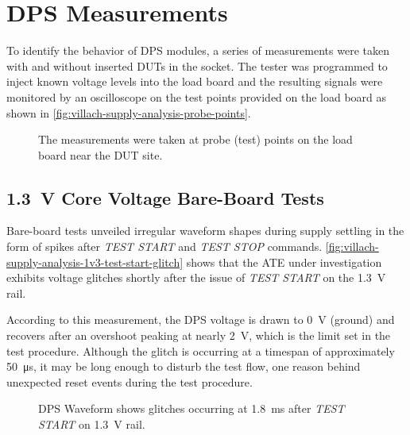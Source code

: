 

\section{\acs{DPS} Measurements}
\label{sec:dps-measurements}

To identify the behavior of \ac{DPS} modules, a series of measurements were
taken with and without inserted \acp{DUT} in the socket.
The tester was programmed to inject known voltage levels into the load board and
the resulting signals were monitored by an oscilloscope on the test points
provided on the load board as shown in
\autoref{fig:villach-supply-analysis-probe-points}.

\begin{figure}
    \centering
    \caption[Probe Points on the Load board]{
        The measurements were taken at probe (test) points on the
        load board near the \acs{DUT} site.
    }
    \label{fig:villach-supply-analysis-probe-points}
\end{figure}

\subsection{\SI{1.3}{\volt} Core Voltage Bare-Board Tests}
\label{subsec:onsite-measurements-no-dut-1v3}

Bare-board tests unveiled irregular waveform shapes during supply
settling in the form of spikes after \emph{TEST START} and
\emph{TEST STOP} commands.
\autoref{fig:villach-supply-analysis-1v3-test-start-glitch} shows that
the \ac{ATE} under investigation exhibits voltage glitches shortly after
the issue of \emph{TEST START} on the \SI{1.3}{\volt} rail.

According to this measurement, the \ac{DPS} voltage
is drawn to \SI{0}{\volt} (ground) and recovers after an overshoot
peaking at nearly \SI{2}{\volt}, which is the limit set in the test procedure.
Although the glitch is occurring at a timespan of approximately
\SI{50}{\micro\second}, it may be long enough to disturb the test flow,
one reason behind unexpected reset events during the test procedure.

\begin{figure}[t]
    \centering
    \caption[\SI{1.3}{\volt} Rail glitch at \emph{TEST START}
    without \acs{DUT}]{
        \ac{DPS} Waveform shows glitches occurring at
        \SI{1.8}{\milli\second} after \emph{TEST START} on \SI{1.3}{\volt} rail.
    }
    \label{fig:villach-supply-analysis-1v3-test-start-glitch}
\end{figure}

